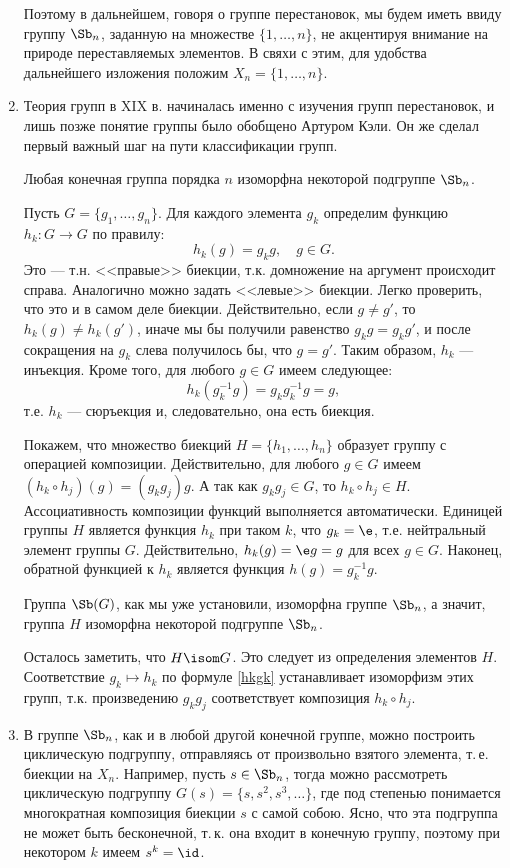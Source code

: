 \begin{enumerate}
Поэтому в дальнейшем, говоря о группе перестановок, мы будем иметь ввиду группу $\Sb_n$, заданную на множестве  $\{1,\dots,n\}$, не акцентируя внимание на природе переставляемых элементов. В свяхи с этим, для удобства дальнейшего изложения положим $X_n=\{1,\dots,n\}$.
\item Теория групп в XIX в. начиналась именно с изучения групп перестановок, и лишь позже понятие группы было обобщено Артуром Кэли. Он же сделал первый важный шаг на пути классификации групп.
\begin{thrm}[Кэли]
Любая конечная группа порядка $n$ изоморфна некоторой подгруппе $\Sb_n$.
\end{thrm}
\pf 
Пусть $G=\{g_1,\dots,g_n\}$. Для каждого элемента $g_k$ определим функцию $h_k:G\to G$ по правилу:
\begin{equation}\label{hkgk}
h_k(g)=g_kg,\quad g\in G.
\end{equation}
Это --- т.н. <<правые>> биекции, т.к. домножение на аргумент происходит справа. Аналогично можно задать <<левые>> биекции. Легко проверить, что это и в самом деле биекции. Действительно, если $g\ne g'$, то
$h_k(g)\ne h_k(g')$, иначе мы бы получили равенство $g_kg=g_kg'$, и после сокращения на $g_k$ слева получилось бы, что $g=g'$. Таким образом, $h_k$ --- инъекция. Кроме того, для любого $g\in G$ имеем следующее:
$$
h_k(g_k^{-1}g) = g_kg_k^{-1}g=g,
$$
т.е. $h_k$ --- сюръекция и, следовательно, она есть биекция.

Покажем, что множество биекций $H=\{h_1,\dots,h_n\}$ образует группу с операцией композиции. Действительно, 
для любого $g\in G$ имеем $(h_k\circ h_j)(g) = (g_kg_j)g$. А так как $g_kg_j\in G$, то $h_k\circ h_j\in H$. 
Ассоциативность композиции функций выполняется автоматически. Единицей группы $H$ является функция $h_k$ при таком $k$, что $g_k=\e$, т.е. нейтральный элемент группы $G$. Действительно, $h_k(g)=\e g=g$ для всех $g\in G$.
Наконец, обратной функцией к $h_k$ является функция $h(g)=g_k^{-1}g$.

Группа $\Sb(G)$, как мы уже установили, изоморфна группе $\Sb_n$, а значит, группа $H$ изоморфна некоторой подгруппе $\Sb_n$.

Осталось заметить, что $H\isom G$. Это следует из определения элементов $H$. Соответствие $g_k\mapsto h_k$ по формуле \eqref{hkgk} устанавливает изоморфизм этих групп, т.к. произведению $g_kg_j$ соответствует композиция $h_k\circ h_j$.
\epf

\item В группе $\Sb_n$, как и в любой другой конечной группе, можно построить циклическую подгруппу, отправляясь от произвольно взятого элемента, т.\,е. биекции на $X_n$. Например, пусть $s\in\Sb_n$, тогда можно рассмотреть циклическую подгруппу $G(s)=\{s,s^2,s^3,\dots\}$, где под степенью понимается многократная композиция биекции $s$ с самой собою. Ясно, что эта подгруппа не может быть бесконечной, т.\,к. она входит в конечную группу, поэтому при некотором $k$ имеем $s^k=\id$.


\end{enumerate}
